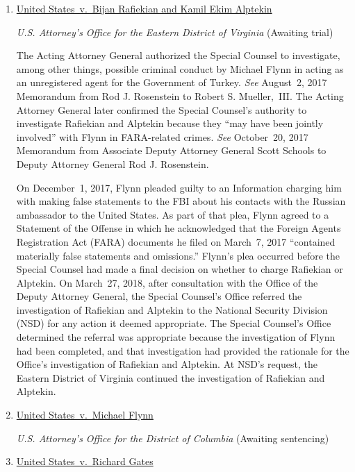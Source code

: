 \begin{enumerate}[1.]

\item \underline{United States~v.\ Bijan Rafiekian and Kamil Ekim Alptekin}

\textit{U.S. Attorney's Office for the Eastern District of Virginia}\hfil\break
(Awaiting trial)

The Acting Attorney General authorized the Special Counsel to investigate, among other things, possible criminal conduct by Michael Flynn in acting as an unregistered agent for the Government of Turkey.
\textit{See} August~2, 2017 Memorandum from Rod J. Rosenstein to Robert S. Mueller,~III\null.
The Acting Attorney General later confirmed the Special Counsel's authority to investigate Rafiekian and Alptekin because they ``may have been jointly involved'' with Flynn in FARA-related crimes.
\textit{See} October~20, 2017 Memorandum from Associate Deputy Attorney General Scott Schools to Deputy Attorney General Rod J. Rosenstein.

On December~1, 2017, Flynn pleaded guilty to an Information charging him with making false statements to the FBI about his contacts with the Russian ambassador to the United States.
As part of that plea, Flynn agreed to a Statement of the Offense in which he acknowledged that the Foreign Agents Registration Act (FARA) documents he filed on March~7, 2017 ``contained materially false statements and omissions.''
Flynn's plea occurred before the Special Counsel had made a final decision on whether to charge Rafiekian or Alptekin.
On March~27, 2018, after consultation with the Office of the Deputy Attorney General, the Special Counsel's Office referred the investigation of Rafiekian and Alptekin to the National Security Division (NSD) for any action it deemed appropriate.
The Special Counsel's Office determined the referral was appropriate because the investigation of Flynn had been completed, and that investigation had provided the rationale for the Office's investigation of Rafiekian and Alptekin.
At NSD's request, the Eastern District of Virginia continued the investigation of Rafiekian and Alptekin.

    \item \underline{United States~v.\ Michael Flynn}

\textit{U.S. Attorney's Office for the District of Columbia}\hfil\break
(Awaiting sentencing)

    \item \underline{United States~v.\ Richard Gates}


\end{enumerate}
